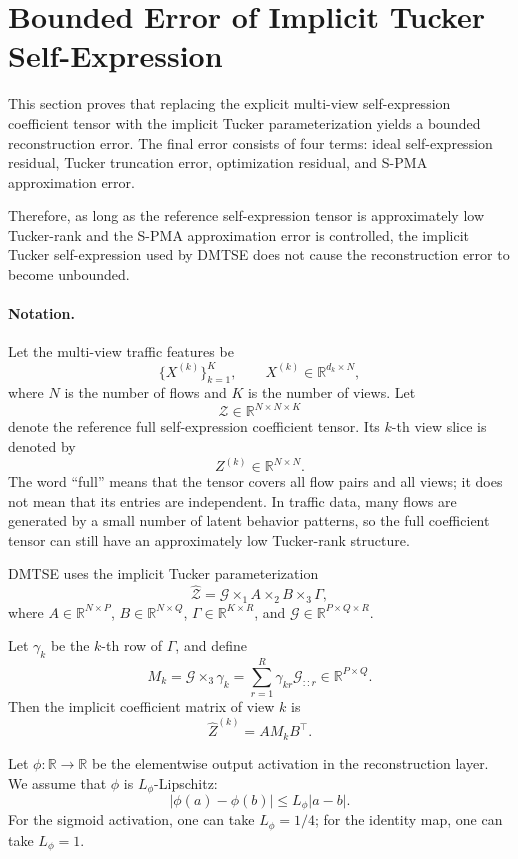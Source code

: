 \documentclass[11pt]{article}
\begin{document}
\section{Bounded Error of Implicit Tucker Self-Expression}
\label{app:bounded_tucker_error}

This section proves that replacing the explicit multi-view self-expression coefficient tensor with the implicit Tucker parameterization yields a bounded reconstruction error. The final error consists of four terms: ideal self-expression residual, Tucker truncation error, optimization residual, and S-PMA approximation error.

Therefore, as long as the reference self-expression tensor is approximately low Tucker-rank and the S-PMA approximation error is controlled, the implicit Tucker self-expression used by DMTSE does not cause the reconstruction error to become unbounded.

\paragraph{Notation.}
Let the multi-view traffic features be
\[
\{X^{(k)}\}_{k=1}^{K},
\qquad
X^{(k)}\in\mathbb R^{d_k\times N},
\]
where $N$ is the number of flows and $K$ is the number of views. Let
\[
\mathcal Z\in\mathbb R^{N\times N\times K}
\]
denote the reference full self-expression coefficient tensor. Its $k$-th view slice is denoted by
\[
Z^{(k)}\in\mathbb R^{N\times N}.
\]
The word ``full'' means that the tensor covers all flow pairs and all views; it does not mean that its entries are independent. In traffic data, many flows are generated by a small number of latent behavior patterns, so the full coefficient tensor can still have an approximately low Tucker-rank structure.

DMTSE uses the implicit Tucker parameterization
\[
\widehat{\mathcal Z}
=
\mathcal G\times_1 A\times_2 B\times_3 \Gamma,
\]
where $A\in\mathbb R^{N\times P}$, $
B\in\mathbb R^{N\times Q}$, $
\Gamma\in\mathbb R^{K\times R}$, and $
\mathcal G\in\mathbb R^{P\times Q\times R}$.

Let $\gamma_k$ be the $k$-th row of $\Gamma$, and define
\[
M_k
=
\mathcal G\times_3 \gamma_k
=
\sum_{r=1}^{R}\gamma_{kr}\mathcal G_{::r}
\in\mathbb R^{P\times Q}.
\]
Then the implicit coefficient matrix of view $k$ is
\[
\widehat Z^{(k)}=A M_k B^\top .
\]

Let $\phi:\mathbb R\to\mathbb R$ be the elementwise output activation in the reconstruction layer. We assume that $\phi$ is $L_\phi$-Lipschitz:
\[
|\phi(a)-\phi(b)|\le L_\phi |a-b|.
\]
For the sigmoid activation, one can take $L_\phi=1/4$; for the identity map, one can take $L_\phi=1$.
\end{document}
